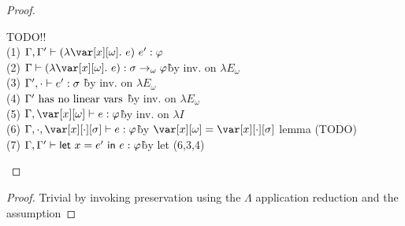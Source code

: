 \begin{proof}~

\begin{tabbing}
    TODO!!\\
    (1) $\G,\G' \vdash (\lambda \xo.~e)~e' : \vp$\\
    (2) $\G \vdash (\lambda \xo.~e) : \s \to_\omega \vp$\` by inv. on $\lambda E_\omega$\\
    (3) $\Gamma', \cdot \vdash e' : \sigma$ \` by inv. on $\lambda E_\omega$\\
    (4) $\Gamma' ~\textrm{has no linear vars}$ \` by inv. on $\lambda E_\omega$\\
    (5) $\G,\xo \vdash e : \vp$\` by inv. on $\lambda I$\\
    (6) $\G, \cdot, \x[\cdot][\s] \vdash e : \vp$\` by $\xo = \x[\cdot][\s]$ lemma (TODO)\\
    (7) $\Gamma,\Gamma' \vdash \mathsf{let}~x = e'~\mathsf{in}~e : \varphi$\` by let (6,3,4)\\
\end{tabbing}
\end{proof}

\BetaReductionMultTheorem

\begin{proof}
    Trivial by invoking preservation using the $\Lambda$ application reduction and the assumption
\end{proof}


